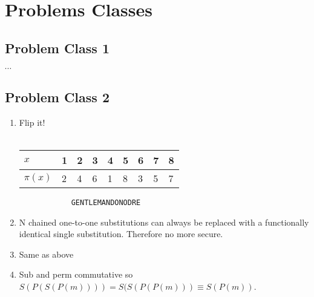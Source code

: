 \chapter{Problems Classes}

	\section{Problem Class 1}
		$\cdots$

	\section{Problem Class 2}
	\begin{enumerate}
		\item Flip it!\\\\
			\begin{tabular}{lllllllll}
				\toprule
				$x$&1&2&3&4&5&6&7&8\\
				\midrule
				$\pi(x)$&2&4&6&1&8&3&5&7\\
				\bottomrule
			\end{tabular}

			\begin{verbatim}
			GENTLEMANDONODRE
			\end{verbatim}

		\item N chained one-to-one substitutions can always be replaced with a functionally identical single substitution. Therefore no more secure.

		\item Same as above

		\item Sub and perm commutative so $S(P(S(P(m)))) = S(S(P(P(m))) \equiv S(P(m))$.
	\end{enumerate}

